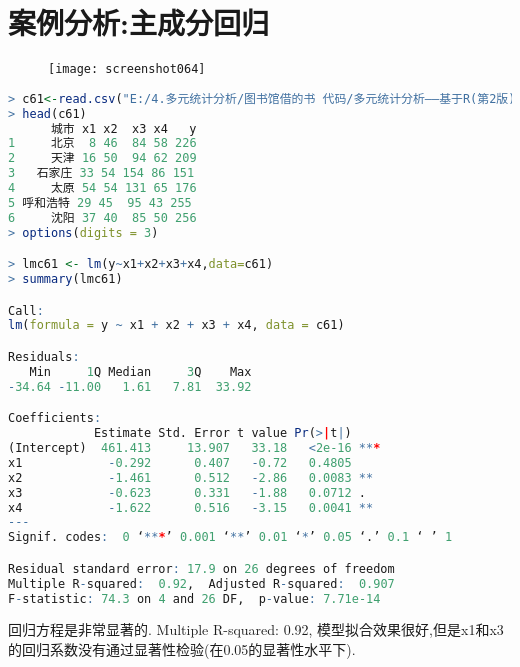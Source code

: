 \documentclass[11pt,a4paper,oneside]{book}
\begin{document}
\section{案例分析:主成分回归}
\begin{figure}[H]
	\centering
	\texttt{[image: screenshot064]}
\end{figure}
\begin{lstlisting}[language=r]
> c61<-read.csv("E:/4.多元统计分析/图书馆借的书 代码/多元统计分析——基于R(第2版) R-data/case6.1.csv")
> head(c61)
      城市 x1 x2  x3 x4   y
1     北京  8 46  84 58 226
2     天津 16 50  94 62 209
3   石家庄 33 54 154 86 151
4     太原 54 54 131 65 176
5 呼和浩特 29 45  95 43 255
6     沈阳 37 40  85 50 256
> options(digits = 3)

> lmc61 <- lm(y~x1+x2+x3+x4,data=c61)
> summary(lmc61)

Call:
lm(formula = y ~ x1 + x2 + x3 + x4, data = c61)

Residuals:
   Min     1Q Median     3Q    Max 
-34.64 -11.00   1.61   7.81  33.92 

Coefficients:
            Estimate Std. Error t value Pr(>|t|)    
(Intercept)  461.413     13.907   33.18   <2e-16 ***
x1            -0.292      0.407   -0.72   0.4805    
x2            -1.461      0.512   -2.86   0.0083 ** 
x3            -0.623      0.331   -1.88   0.0712 .  
x4            -1.622      0.516   -3.15   0.0041 ** 
---
Signif. codes:  0 ‘***’ 0.001 ‘**’ 0.01 ‘*’ 0.05 ‘.’ 0.1 ‘ ’ 1

Residual standard error: 17.9 on 26 degrees of freedom
Multiple R-squared:  0.92,	Adjusted R-squared:  0.907 
F-statistic: 74.3 on 4 and 26 DF,  p-value: 7.71e-14
\end{lstlisting}
回归方程是非常显著的. Multiple R-squared:  0.92, 模型拟合效果很好,但是x1和x3的回归系数没有通过显著性检验(在0.05的显著性水平下).
\end{document}
